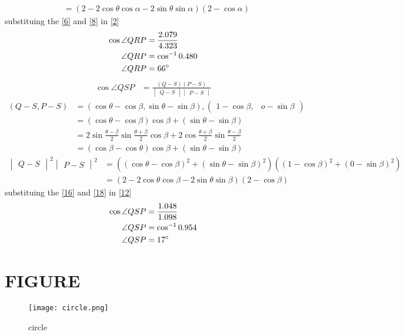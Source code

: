 \documentclass[12pt]{article}
\newcommand{\mydet}[1]{\ensuremath{\begin{vmatrix}#1\end{vmatrix}}}
\newcommand{\myvec}[1]{\ensuremath{\begin{pmatrix}#1\end{pmatrix}}}
\begin{document}
\begin{enumerate}
\begin{align}
	&=(2-2\cos\theta\cos\alpha-2\sin\theta\sin\alpha)(2-\cos\alpha)\label{8}
\end{align}
substituing the \eqref{6} and \eqref{8} in \eqref{2}
\begin{align}
\cos\angle QRP&=\frac{2.079}{4.323}\\
\angle QRP&=\cos^{-1}0.480\\
\angle QRP&=66\degree
\end{align}
\begin{align}
\cos\angle QSP&= \frac{ (Q-S) (P-S)}{\mydet{Q-S}\mydet{P-S}}\label{12}
\end{align}
\begin{align}
(Q-S, P-S) &= (\cos\theta-\cos\beta,\sin\theta-\sin\beta),\myvec{1-\cos\beta,& o-\sin\beta}\\
&=(\cos\theta-\cos\beta)\cos\beta+(\sin\theta-\sin\beta)\\
&=2\sin\frac{\theta-\beta}{2}\sin\frac{\theta+\beta}{2}\cos\beta+2\cos\frac{\theta+\beta}{2}\sin\frac{\theta-\beta}{2}\\
&=(\cos\beta-\cos\theta)\cos\beta+(\sin\theta-\sin\beta)\label{16}
\end{align}
\begin{align}
\mydet{Q-S}^2\mydet{P-S}^2 &= ((\cos\theta-\cos\beta)^2+(\sin\theta-\sin\beta)^2)
	((1-\cos\beta)^2+(0-\sin\beta)^2)\\
	&=(2-2\cos\theta\cos\beta-2\sin\theta\sin\beta)(2-\cos\beta)\label{18}
\end{align}
substituing the \eqref{16} and \eqref{18} in \eqref{12}
\begin{align}
\cos\angle QSP&=\frac{1.048}{1.098}\\
\angle QSP&=\cos^{-1}0.954\\
\angle QSP&=17\degree
\end{align}
\section{FIGURE}
\begin{figure}[h]
\centering
\texttt{[image: circle.png]}
\caption{circle}
		\label{fig:Figure}
\end{figure}
\end{enumerate}
\end{document}
